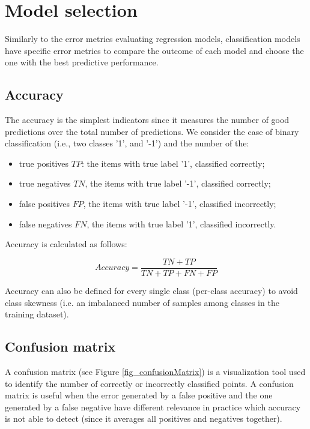 \section{Model selection}
Similarly to the error metrics evaluating regression models, classification models have specific error metrics to compare the outcome of each model and choose the one with the best predictive performance.

\subsection{Accuracy}
The accuracy is the simplest indicators since it measures the number of good predictions over the total number of predictions. We consider the case of binary classification (i.e., two classes '1', and '-1') and the number of the:

\begin{itemize}
    \item true positives $TP$: the items with true label '1', classified correctly;
    \item true negatives $TN$, the items with true label '-1', classified correctly;
    \item false positives $FP$, the items with true label '-1', classified incorrectly;
    \item false negatives $FN$, the items with true label '1', classified incorrectly.
\end{itemize}
Accuracy is calculated as follows:

\begin{equation}
        Accuracy=\frac{TN+TP}{TN+TP+FN+FP}
        \label{eq_accuracy}
\end{equation}

Accuracy can also be defined for every single class (per-class accuracy) to avoid class skewness (i.e. an imbalanced number of samples among classes in the training dataset).

\subsection{Confusion matrix}
A confusion matrix (see Figure \ref{fig_confusionMatrix}) is a visualization tool used to identify the number of correctly or incorrectly classified points. A confusion matrix is useful when the error generated by a false positive and the one generated by a false negative have different relevance in practice which accuracy is not able to detect (since it averages all positives and negatives together).

